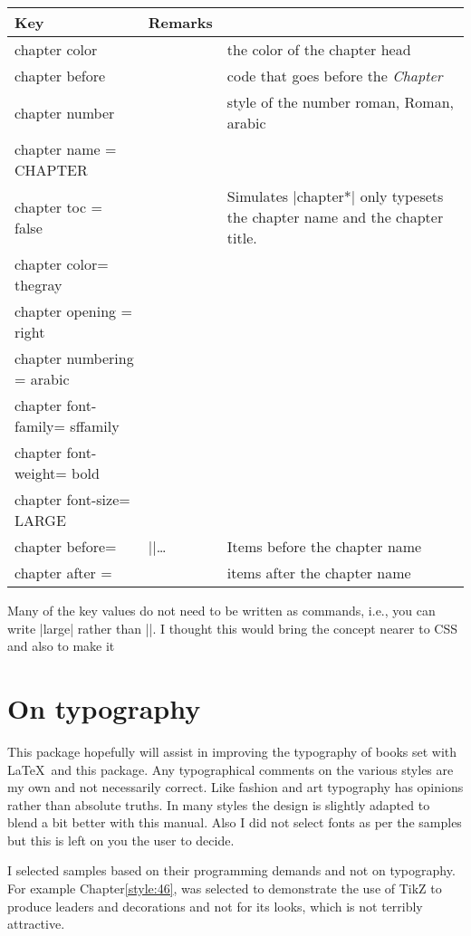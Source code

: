\begin{longtable}{lp{3cm}p{6cm}}
\toprule
Key           &Remarks\\ 
\midrule
chapter color && the color of the chapter head\\
chapter before && code that goes before the \textit{Chapter}\\
chapter number &&style of the number roman, Roman, arabic\\
 chapter name = CHAPTER &&\\
 chapter toc = false && Simulates |chapter*| only typesets the chapter name and the chapter title.\\
 chapter color= thegray &&\\
 chapter opening = right &&\\
 chapter numbering = arabic &&\\
 chapter font-family= sffamily &&\\
 chapter font-weight= bold &&\\
 chapter font-size= LARGE &&\\
 chapter before= &|\thinrule|\ldots& Items before the chapter name\\
 chapter after = &&items after the chapter name\\
\bottomrule
\end{longtable}

Many of the key values do not need to be written as commands, i.e., you can write |large| rather than |\large|. I thought this would bring the concept nearer to CSS and also to make it


\section{On typography}

This package hopefully will assist in improving the typography of books set with \LaTeX\ and this package. Any typographical comments on the various styles are my own and not necessarily correct. Like fashion and art typography has opinions rather than absolute truths. In many styles the design is slightly adapted to blend a bit better with this manual. Also I did not select fonts as per the samples but this is left on you the user to decide.

I selected samples based on their programming demands and not on  typography. For example Chapter\ref{style:46}, was selected to demonstrate the use of TikZ to produce leaders and decorations and not for its looks, which is not terribly attractive.

